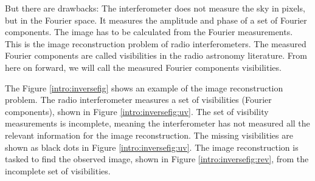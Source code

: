 But there are drawbacks: The interferometer does not measure the sky in pixels, but in the Fourier space. It measures the amplitude and phase of a set of Fourier components. The image has to be calculated from the Fourier measurements. This is the image reconstruction problem of radio interferometers. The measured Fourier components are called visibilities in the radio astronomy literature. From here on forward, we will call the measured Fourier components visibilities.

The Figure \ref{intro:inversefig} shows an example of the image reconstruction problem. The radio interferometer measures a set of visibilities (Fourier components), shown in Figure \ref{intro:inversefig:uv}. The set of visibility measurements is incomplete, meaning the interferometer has not measured all the relevant information for the image reconstruction. The missing visibilities are shown as black dots in Figure \ref{intro:inversefig:uv}. The image reconstruction is tasked to find the observed image, shown in Figure \ref{intro:inversefig:rev}, from the incomplete set of visibilities. 

